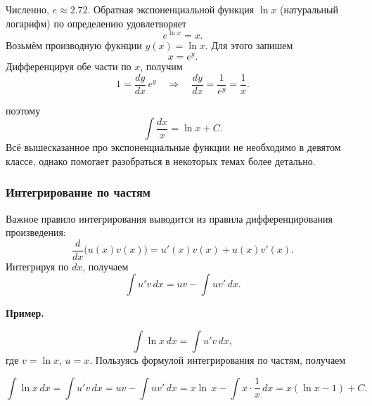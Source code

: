 \documentclass[12pt, a4paper]{article}%
\begin{document}
Численно, $e \approx 2.72$.
Обратная экспоненциальной функция $\ln x$ (натуральный логарифм) по определению удовлетворяет
\[
e^{\ln x} = x.
\]
Возьмём производную фукнции $y(x) = \ln x$. Для этого запишем
\[
x = e^y.
\]
Дифференцируя обе части по $x$, получим
\[
1 = \frac{dy}{dx}\,e^y \quad \Rightarrow\quad\frac{dy}{dx} = \frac{1}{e^y} = \frac1x.
\]

поэтому
\[
\int \frac{dx}{x} = \ln x + C.
\]
Всё вышесказанное про экспоненциальные функции не необходимо в девятом классе, однако помогает разобраться в некоторых темах более детально.
\subsubsection*{Интегрирование по частям}

Важное правило интегрирования выводится из правила дифференцирования произведения:
\[
\frac{d}{dx}\bigl(u(x)v(x)\bigr)=u'(x)v(x)+u(x)v'(x).
\]
Интегрируя по $dx$, получаем
\[
\int u'v\,dx = uv - \int uv'\,dx.
\]

\textbf{Пример.}

\[
\int \ln x\, dx = \int u'v\,dx,
\]
где $v = \ln x$, $u = x$. Пользуясь формулой интегрирования по частям, получаем

\[
\int \ln x\, dx = \int u'v\,dx = uv - \int uv'\,dx = x\ln\,x-\int x\cdot\frac1x\,dx = x (\ln x-1)+C.
\]
\end{document}
